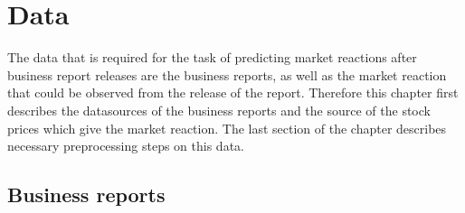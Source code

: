 \chapter{Data}\label{ch:data}

The data that is required for the task of predicting market reactions after business report releases are the business reports, as well as the market reaction that could be observed from the release of the report.
Therefore this chapter first describes the datasources of the business reports and the source of the stock prices which give the market reaction.
The last section of the chapter describes necessary preprocessing steps on this data.

\section{Business reports}
\label{sec:business_reports}

